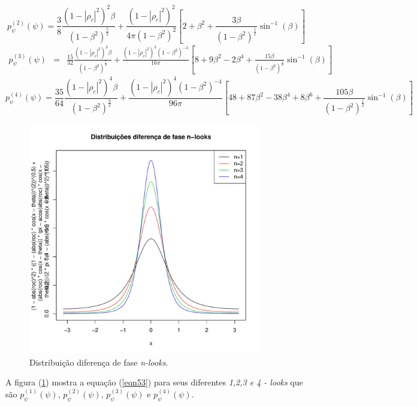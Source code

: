 \documentclass[12pt,a4paper]{article}
\begin{document}
\begin{equation}\label{eqn56}
	p_{\psi}^{(2)}(\psi)=\frac{3}{8}\frac{(1-|\rho_c|^2)^2\beta}{(1-\beta^2)^{\frac{5}{2}}}+\frac{(1-|\rho_c|^2)^2}{4\pi(1-\beta^2)^{2}}\left[2+\beta^2+\frac{3\beta}{(1-\beta^2)^{\frac{1}{2}}}\sin^{-1}(\beta)\right]
\end{equation}
\begin{equation}\label{eqn57}
\begin{array}{ccc}
	p_{\psi}^{(3)}(\psi)&=&\frac{15}{32}\frac{(1-|\rho_c|^2)^3\beta}{(1-\beta^2)^{\frac{7}{2}}}+\frac{(1-|\rho_c|^2)^3(1-\beta^2)^{-3}}{16\pi}\left[8+9\beta^2-2\beta^4+\frac{15\beta}{(1-\beta^2)^{\frac{1}{2}}}\sin^{-1}(\beta)\right]
\end{array}
\end{equation}
\begin{equation}\label{eqn58}
	p_{\psi}^{(4)}(\psi)=\frac{35}{64}\frac{(1-|\rho_c|^2)^4\beta}{(1-\beta^2)^{\frac{9}{2}}}+\frac{(1-|\rho_c|^2)^4(1-\beta^2)^{-4}}{96\pi}\left[48+87\beta^2-38\beta^4+8\beta^6+\frac{105\beta}{(1-\beta^2)^{\frac{1}{2}}}\sin^{-1}(\beta)\right]
\end{equation}

\begin{figure}[!h]
\centering
\includegraphics[width=4.0in]{fig1_eq_18_lee_1994.pdf}
	\caption{Distribuição diferença de fase {\it n-looks}.}
\label{fig1}
\end{figure}

A  figura (\ref{fig1}) mostra a equação (\ref{eqn53}) para seus diferentes {\it 1,2,3 e 4 - looks} que são $p_{\psi}^{(1)}(\psi)$, $p_{\psi}^{(2)}(\psi)$, $p_{\psi}^{(3)}(\psi)$ e $p_{\psi}^{(4)}(\psi)$.
\end{document}
